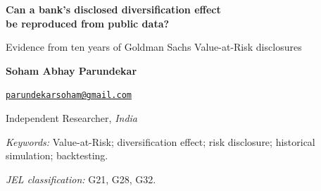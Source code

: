\documentclass[11pt,letterpaper]{article}
\providecommand{\SohamLocation}{\textit{India}}
\begin{document}
\thispagestyle{plain}
\begin{center}
{\LARGE\bfseries Can a bank's disclosed diversification effect\\
 be reproduced from public data?\par}
\vspace{7pt}
{\large Evidence from ten years of Goldman Sachs Value-at-Risk disclosures\par}
\vspace{14pt}

{\fontsize{10.1}{11.7}\selectfont\bfseries Soham Abhay Parundekar\par}
\vspace{1.5pt}
{\fontsize{8.0}{9.4}\selectfont\href{mailto:parundekarsoham@gmail.com}%
  {\nolinkurl{parundekarsoham@gmail.com}}\par}
\vspace{1.0pt}
{\fontsize{8.5}{10.0}\selectfont Independent Researcher, \SohamLocation\par}
\end{center}
\vspace{8pt}

\begin{abstract}

\end{abstract}

\noindent\textit{Keywords:} Value-at-Risk; diversification effect; risk
disclosure; historical simulation; backtesting.\par
\noindent\textit{JEL classification:} G21, G28, G32.
\vspace{8pt}












\begingroup
\small
\setlength{\bibsep}{4pt}


\endgroup

\appendix



\end{document}
